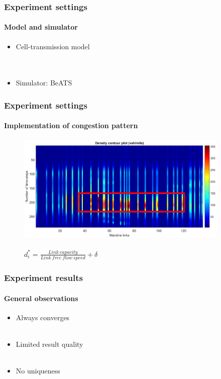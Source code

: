 \documentclass[fleqn]{beamer}
\begin{document}
\begin{frame}
	\frametitle{Experiment settings}
	\framesubtitle{Model and simulator}
	\begin{itemize}
	\item Cell-transmission model\\
	~\\
	~\\
	\item Simulator: BeATS
	\end{itemize}
\end{frame}


\begin{frame}
	\frametitle{Experiment settings}
	\framesubtitle{Implementation of congestion pattern}
	\begin{figure}
		\centering
		\includegraphics[width=4in]{figures/PeMS_contour.png}\\
		~\\
		$d_{i}^{*}=\frac{Link\ capacity}{Link\ free\ flow\ speed}+\delta$
	\end{figure}
\end{frame}


\begin{frame}
	\frametitle{Experiment results}
	\framesubtitle{General observations}
	\begin{itemize}
		\item Always converges\\
		~\\
		\item Limited result quality\\
		~\\
		\item No uniqueness\\
	\end{itemize}	
\end{frame}
\end{document}
